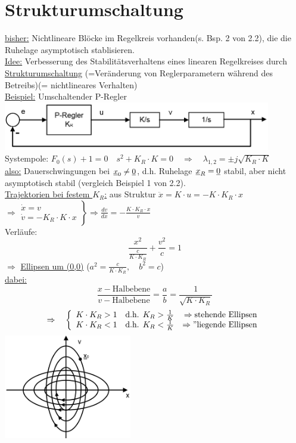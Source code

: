\documentclass[openany,a4paper,11pt]{book}
\begin{document}
\section{Strukturumschaltung}
\uline{bisher:} Nichtlineare Blöcke im Regelkreis vorhanden(s. Bsp. 2 von 2.2), die die Ruhelage asymptotisch stablisieren.\\
\uline{Idee:} Verbesserung des Stabilitätsverhaltens eines linearen Regelkreises durch \uline{Strukturumschaltung} (=Veränderung von Reglerparametern während des Betreibs)(= nichtlineares Verhalten)\\
\uline{Beispiel:} Umschaltender P-Regler\\
\includegraphics[width=4.6in]{imgs/NLR20.png}\\
Systempole: $F_0(s)+1=0\quad s^2+K_R\cdot K=0 \quad \Rightarrow \quad \lambda_{1,2}=\pm j\sqrt{K_R\cdot K}$\\
\uline{also:} Dauerschwingungen bei $\uline{x}_0\ne \uline{0}$, d.h. Ruhelage $\uline{x}_R= \uline{0}$ stabil, aber nicht asymptotisch stabil (vergleich Beispiel 1 von 2.2).\\
\uline{Trajektorien bei festem $K_R$:} aus Struktur $\ddot{x}=K\cdot u=-K\cdot K_R\cdot x$\\
$\Rightarrow \left.
\begin{array}{r}
\dot{x}=v\\
\dot{v}=-K_R\cdot K\cdot x
\end{array}
\right\} \Rightarrow \frac{dv}{dx}=-\frac{K\cdot K_R\cdot x}{v}$\\
Verläufe: 
\[\frac{x^2}{\frac{c}{K\cdot K_R}}+\frac{v^2}{c}=1\]
$\Rightarrow$ \uline{Ellipsen um (0,0)}  ($a^2=\frac{c}{K\cdot K_R},\quad b^2=c$)\\
\uline{dabei:}
\[\frac{x-\text{Halbebene}}{v-\text{Halbebene}}=\frac{a}{b}=\frac{1}{\sqrt{K \cdot K_R}}\]
\[\Rightarrow\quad
\left \{%
\begin{array}{lcrcl}
     K\cdot K_R>1 & \text{d.h. } K_R>\frac{1}{K} & \Rightarrow \text{stehende Ellipsen}\\
     K\cdot K_R<1 & \text{d.h. } K_R<\frac{1}{K} & \Rightarrow "\text{liegende Ellipsen}\\
\end{array} \right.\]
\includegraphics[width=2.2in]{imgs/NLR21.png}\\
\end{document}
